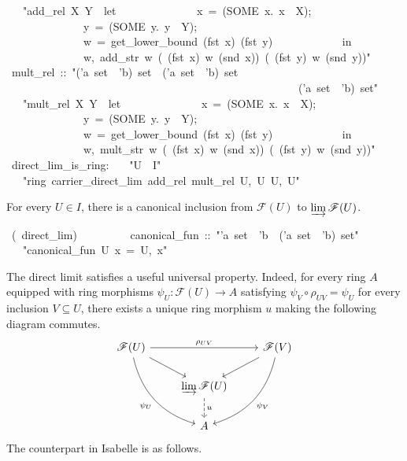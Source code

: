 \documentclass[12pt]{scrartcl}
\begin{document}
\begin{isabelle}
\ \ \ "add\_rel\ X\ Y\ \isasymequiv \ let\isanewline
\ \ \ \ \ \ \ \ \ \ \ \ \ \ x\ =\ (SOME\ x.\ x\ \isasymin \ X);\isanewline
\ \ \ \ \ \ \ \ \ \ \ \ \ \ y\ =\ (SOME\ y.\ y\ \isasymin \ Y);\isanewline
\ \ \ \ \ \ \ \ \ \ \ \ \ \ w\ =\ get\_lower\_bound\ (fst\ x)\ (fst\ y)\isanewline
\ \ \ \ \ \ \ \ \ \ \ \ in\isanewline
\ \ \ \ \ \ \ \ \ \ \ \ \ \ \isasymlfloor w,\ add\_str\ w\ (\isasymrho \ (fst\ x)\ w\ (snd\ x))\ (\isasymrho \ (fst\ y)\ w\ (snd\ y))\isasymrfloor "\isanewline
\isanewline
{}\ mult\_rel\ ::\ "('a\ set\ \isasymtimes \ 'b)\ set\ \isasymRightarrow \ ('a\ set\ \isasymtimes \ 'b)\ set\ \isanewline
\ \ \ \ \ \ \ \ \ \ \ \ \ \ \ \ \ \ \ \ \ \ \ \ \ \ \ \ \ \ \ \ \ \ \ \ \ \ \ \ \ \ \ \ \ \ \ \ \ \ \ \ \isasymRightarrow \ ('a\ set\ \isasymtimes \ 'b)\ set"\isanewline
\ \ \ "mult\_rel\ X\ Y\ \isasymequiv \ let\isanewline
\ \ \ \ \ \ \ \ \ \ \ \ \ \ x\ =\ (SOME\ x.\ x\ \isasymin \ X);\isanewline
\ \ \ \ \ \ \ \ \ \ \ \ \ \ y\ =\ (SOME\ y.\ y\ \isasymin \ Y);\isanewline
\ \ \ \ \ \ \ \ \ \ \ \ \ \ w\ =\ get\_lower\_bound\ (fst\ x)\ (fst\ y)\isanewline
\ \ \ \ \ \ \ \ \ \ \ \ in\isanewline
\ \ \ \ \ \ \ \ \ \ \ \ \ \ \isasymlfloor w,\ mult\_str\ w\ (\isasymrho \ (fst\ x)\ w\ (snd\ x))\ (\isasymrho \ (fst\ y)\ w\ (snd\ y))\isasymrfloor "\isanewline
\isanewline
{}\ direct\_{lim}\_{is}\_{ring}:\isanewline
\ \ \ "U\ \isasymin \ I"\isanewline
\ \ \ "ring\ carrier\_direct\_lim\ add\_rel\ mult\_rel\ \isasymlfloor U,\ \isasymzero \isactrlbsub U\isactrlesub \isasymrfloor \ \isasymlfloor U,\ \isasymone \isactrlbsub U\isactrlesub \isasymrfloor "\isanewline
\isanewline
{}
\end{isabelle}

For every $U \in I$, there is a canonical inclusion from $\mathscr{F}(U)$ to $\varinjlim \mathscr{F}(U)$. 

\begin{isabelle}
\ (\ direct\_lim)\ \isanewline
\ \ \ \ \ \ \ \ canonical\_fun\ ::\ "'a\ set\ \isasymRightarrow \ 'b\ \isasymRightarrow \ ('a\ set\ \isasymtimes \ 'b)\ set"\isanewline
\ \ \ "canonical\_fun\ U\ x\ =\ \isasymlfloor U,\ x\isasymrfloor "
\end{isabelle}

The direct limit satisfies a useful universal property. Indeed, for every ring $A$ equipped with ring morphisms $\psi_U: \mathscr{F}(U) \rightarrow A$ satisfying $\psi_V \circ \rho_{UV} = \psi_U$ for every inclusion $V \subseteq U$, there exists a unique ring morphism $u$ making the following diagram commutes.
\[
\begin{tikzcd}
\mathscr{F}(U)  \arrow[rr, "\rho_{UV}"] \arrow[rd] \arrow[rdd, bend right, "\psi_U"'] & & \mathscr{F}(V) \arrow[ld]	\arrow[ldd, bend left, "\psi_V"]	\\
						& \varinjlim \mathscr{F}(U) \arrow[d, "u", dashed] &	\\
						& A &  
\end{tikzcd}
\] 
The counterpart in Isabelle is as follows.
\end{document}

